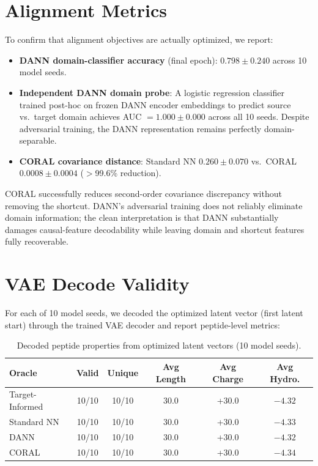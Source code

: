 \documentclass{article}
\begin{document}
\section{Alignment Metrics} \label{sec:alignment}
To confirm that alignment objectives are actually optimized, we report:
\begin{itemize}
    \item \textbf{DANN domain-classifier accuracy} (final epoch): $0.798 \pm 0.240$ across 10 model seeds.
    \item \textbf{Independent DANN domain probe}: A logistic regression classifier trained post-hoc on frozen DANN encoder embeddings to predict source vs.\ target domain achieves AUC $= 1.000 \pm 0.000$ across all 10 seeds. Despite adversarial training, the DANN representation remains perfectly domain-separable.
    \item \textbf{CORAL covariance distance}: Standard NN $0.260 \pm 0.070$ vs.\ CORAL $0.0008 \pm 0.0004$ ($>$99.6\% reduction).
\end{itemize}
CORAL successfully reduces second-order covariance discrepancy without removing the shortcut. DANN's adversarial training does not reliably eliminate domain information; the clean interpretation is that DANN substantially damages causal-feature decodability while leaving domain and shortcut features fully recoverable.

\section{VAE Decode Validity} \label{sec:vae_validity}
For each of 10 model seeds, we decoded the optimized latent vector (first latent start) through the trained VAE decoder and report peptide-level metrics:

\begin{table}[H]
\centering
\caption{Decoded peptide properties from optimized latent vectors (10 model seeds).}
\label{tab:vae_validity}
\begin{tabular}{lccccc}
\toprule
Oracle & Valid & Unique & Avg Length & Avg Charge & Avg Hydro. \\
\midrule
Target-Informed & 10/10 & 10/10 & 30.0 & +30.0 & $-4.32$ \\
Standard NN & 10/10 & 10/10 & 30.0 & +30.0 & $-4.33$ \\
DANN & 10/10 & 10/10 & 30.0 & +30.0 & $-4.32$ \\
CORAL & 10/10 & 10/10 & 30.0 & +30.0 & $-4.34$ \\
\bottomrule
\end{tabular}
\end{table}
\end{document}
